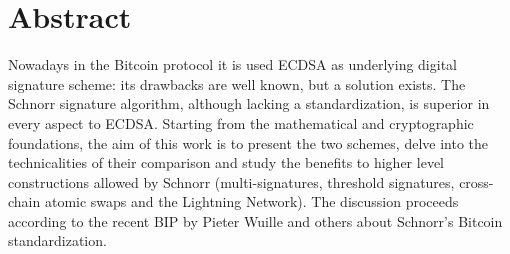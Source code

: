 \chapter{Abstract}
\label{chpr:abstract}
Nowadays in the Bitcoin protocol it is used ECDSA as underlying digital signature scheme: its drawbacks are well known, but a solution exists. The Schnorr signature algorithm, although lacking a standardization, is superior in every aspect to ECDSA. Starting from the mathematical and cryptographic foundations, the aim of this work is to present the two schemes, delve into the technicalities of their comparison and study the benefits to higher level constructions allowed by Schnorr (multi-signatures, threshold signatures, cross-chain atomic swaps and the Lightning Network). The discussion proceeds according to the recent BIP by Pieter Wuille and others about Schnorr's Bitcoin standardization.